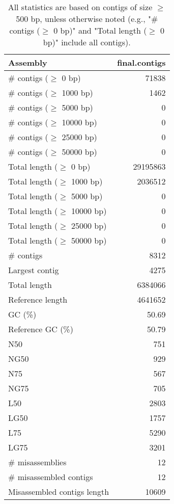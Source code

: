 \documentclass[12pt,a4paper]{article}
\begin{document}
\begin{table}[ht]
\begin{center}
\caption{All statistics are based on contigs of size $\geq$ 500 bp, unless otherwise noted (e.g., "\# contigs ($\geq$ 0 bp)" and "Total length ($\geq$ 0 bp)" include all contigs).}
\begin{tabular}{|l*{1}{|r}|}
\hline
Assembly & final.contigs \\ \hline
\# contigs ($\geq$ 0 bp) & 71838 \\ \hline
\# contigs ($\geq$ 1000 bp) & 1462 \\ \hline
\# contigs ($\geq$ 5000 bp) & 0 \\ \hline
\# contigs ($\geq$ 10000 bp) & 0 \\ \hline
\# contigs ($\geq$ 25000 bp) & 0 \\ \hline
\# contigs ($\geq$ 50000 bp) & 0 \\ \hline
Total length ($\geq$ 0 bp) & 29195863 \\ \hline
Total length ($\geq$ 1000 bp) & 2036512 \\ \hline
Total length ($\geq$ 5000 bp) & 0 \\ \hline
Total length ($\geq$ 10000 bp) & 0 \\ \hline
Total length ($\geq$ 25000 bp) & 0 \\ \hline
Total length ($\geq$ 50000 bp) & 0 \\ \hline
\# contigs & 8312 \\ \hline
Largest contig & 4275 \\ \hline
Total length & 6384066 \\ \hline
Reference length & 4641652 \\ \hline
GC (\%) & 50.69 \\ \hline
Reference GC (\%) & 50.79 \\ \hline
N50 & 751 \\ \hline
NG50 & 929 \\ \hline
N75 & 567 \\ \hline
NG75 & 705 \\ \hline
L50 & 2803 \\ \hline
LG50 & 1757 \\ \hline
L75 & 5290 \\ \hline
LG75 & 3201 \\ \hline
\# misassemblies & 12 \\ \hline
\# misassembled contigs & 12 \\ \hline
Misassembled contigs length & 10609 \\ \hline

\end{tabular}
\end{center}
\end{table}
\end{document}

